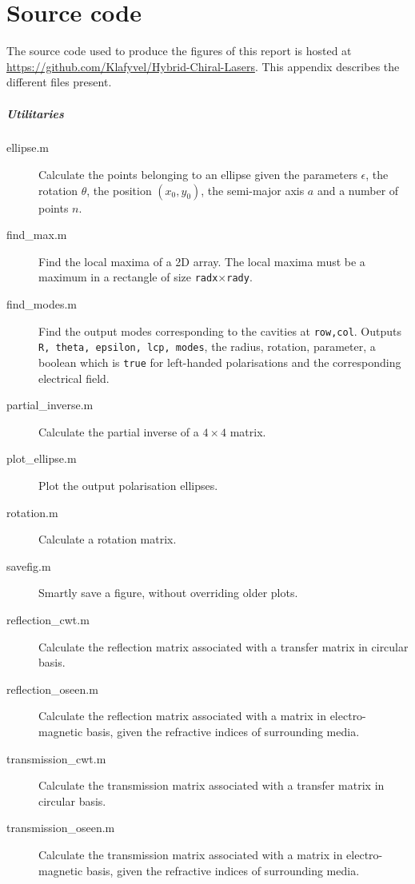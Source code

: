 \chapter{Source code}
\label{chap:sourcecode}

The source code used to produce the figures of this report is hosted at \url{https://github.com/Klafyvel/Hybrid-Chiral-Lasers}. This appendix describes the different files present.

\paragraph{Utilitaries}

\begin{description}
	\item[ellipse.m] Calculate the points belonging to an ellipse given the parameters $\epsilon$, the rotation $\theta$, the position $(x_0, y_0)$, the semi-major axis $a$ and a number of points $n$.
	\item[find\_max.m] Find the local maxima of a 2D array. The local maxima must be a maximum in a rectangle of size \verb|radx|$\times$\verb|rady|.
	\item[find\_modes.m] Find the output modes corresponding to the cavities at \verb|row,col|. Outputs \verb|R, theta, epsilon, lcp, modes|, the radius, rotation, parameter, a boolean which is \verb|true| for left-handed polarisations and the corresponding electrical field.
	\item[partial\_inverse.m] Calculate the partial inverse of a $4\times4$ matrix.
	\item[plot\_ellipse.m] Plot the output polarisation ellipses.
	\item[rotation.m] Calculate a rotation matrix.
	\item[savefig.m] Smartly save a figure, without overriding older plots.
	\item[reflection\_cwt.m] Calculate the reflection matrix associated with a transfer matrix in circular basis.
	\item[reflection\_oseen.m] Calculate the reflection matrix associated with a matrix in electro-magnetic basis, given the refractive indices of surrounding media.
	\item[transmission\_cwt.m] Calculate the transmission matrix associated with a transfer matrix in circular basis.
	\item[transmission\_oseen.m] Calculate the transmission matrix associated with a matrix in electro-magnetic basis, given the refractive indices of surrounding media.
\end{description}

